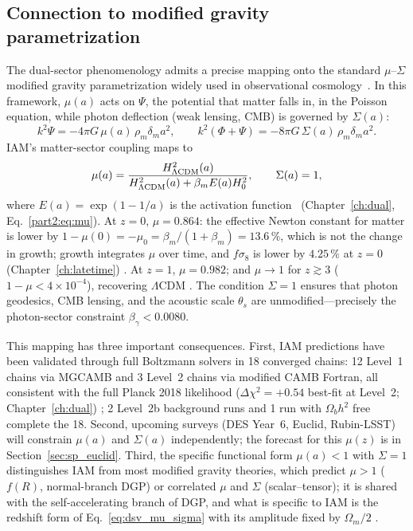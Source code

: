 \subsection{Connection to modified gravity parametrization}\label{sec:dsv_musigma}
The dual-sector phenomenology admits a precise mapping onto the standard $\mu$--$\Sigma$ modified gravity parametrization widely used in observational
cosmology~\cite{Amendola2018}. In this framework, $\mu(a)$ acts on $\Psi$, the potential that matter falls in, in the Poisson equation, while photon deflection
(weak lensing, CMB) is governed by $\Sigma(a)$:
\begin{equation}
k^2\Psi=-4\pi G\,\mu(a)\,\rho_m\delta_m a^2,\qquad k^2(\Phi+\Psi)=-8\pi G\,\Sigma(a)\,\rho_m\delta_m a^2. \label{eq:dsv_poisson}
\end{equation}
IAM's matter-sector coupling maps to
\begin{equation}
\mu(a)=\frac{H^2_{\Lambda\rm CDM}(a)}{H^2_{\Lambda\rm CDM}(a)+\beta_mE(a)H_0^2},\qquad\Sigma(a)=1, \label{eq:dsv_mu_sigma}
\end{equation}
where $E(a)=\exp(1-1/a)$ is the activation function \derived\ (Chapter~\ref{ch:dual}, Eq.~\eqref{part2:eq:mu}). At $z=0$, $\mu=0.864$: the effective Newton
constant for matter is lower by $1-\mu(0)=-\mu_0=\beta_m/(1+\beta_m)=13.6\,\%$, which is not the change in growth; growth integrates $\mu$ over time, and
$f\sigma_8$ is lower by $4.25\,\%$ at $z=0$ (Chapter~\ref{ch:latetime}) \calc. At $z=1$, $\mu=0.982$; and $\mu\to1$ for $z\gtrsim3$ ($1-\mu<4\times10^{-4}$),
recovering $\Lambda$CDM \calc. The condition $\Sigma=1$ ensures that photon geodesics, CMB lensing, and the acoustic scale $\theta_s$ are
unmodified---precisely the photon-sector constraint $\beta_\gamma<0.0080$.

This mapping has three important consequences. First, IAM predictions have been validated through full Boltzmann solvers in 18 converged chains: 12 Level~1 chains via MGCAMB
and 3 Level~2 chains via modified CAMB Fortran, all consistent with the full Planck 2018 likelihood ($\Delta\chi^2=+0.54$ best-fit at Level~2;
Chapter~\ref{ch:dual}) \measured; 2 Level~2b background runs and 1 run with $\Omega_bh^2$ free complete the 18. Second, upcoming surveys (DES Year~6, Euclid, Rubin-LSST) will constrain $\mu(a)$ and $\Sigma(a)$ independently;
the forecast for this $\mu(z)$ is in Section~\ref{sec:sp_euclid}. Third, the specific functional form $\mu(a)<1$ with $\Sigma=1$
distinguishes IAM from most modified gravity theories, which predict $\mu>1$ ($f(R)$, normal-branch DGP) or correlated $\mu$ and $\Sigma$
(scalar--tensor); it is shared with the self-accelerating branch of DGP, and what is specific to IAM is the redshift form of Eq.~\eqref{eq:dsv_mu_sigma}
with its amplitude fixed by $\Omega_m/2$ \derived.

